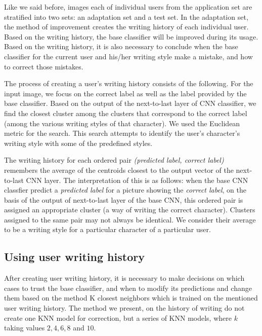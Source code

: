 \documentclass{article}
\begin{document}
Like we said before, images each of individual users from the application set are stratified into two sets: an adaptation set and a test set. %
In the adaptation set, the method of improvement creates the writing history of each individual user. 
Based on the writing history, the base classifier will be improved during its usage. 
Based on the writing history, it is also necessary to conclude when the base classifier for the current user and his/her writing style make a mistake, and how to correct those mistakes. 

The process of creating a user's writing history consists of the following. 
For the input image, we focus on the correct label as well as the label provided by the base classifier. 
Based on the output of the next-to-last layer of CNN classifier, we find the closest cluster among the clusters that correspond to the correct label (among the various writing styles of that character). 
We used the Euclidean metric for the search. %
This search attempts to identify the user's character's writing style with some of the predefined styles.  

The writing history for each ordered pair \textit{(predicted label, correct label)} remembers the average of the centroids closest to the output vector of the next-to-last CNN layer. 
The interpretation of this is as follows: when the base CNN classfier predict %
 a \textit{predicted label} for a picture showing the \textit{correct label}, 
on the basis of the output of next-to-last layer of the base CNN, this ordered pair is assigned an appropriate cluster (a way of writing the correct character). 
Clusters assigned to the same pair may not always be identical. 
We consider their average to be a writing style for a particular character of a particular user. 

\subsection{Using user writing history}

After creating user writing history, it is necessary to make decisions on which cases to trust the base classifier, and when to modify its predictions and change them based on the method K closest neighbors 
which is trained on the mentioned user writing history. 
The method we present, on the history of writing do not create one KNN model for correction, but a series of KNN models, where $k$ taking values $2, 4, 6, 8$ and $10$. 
\end{document}

